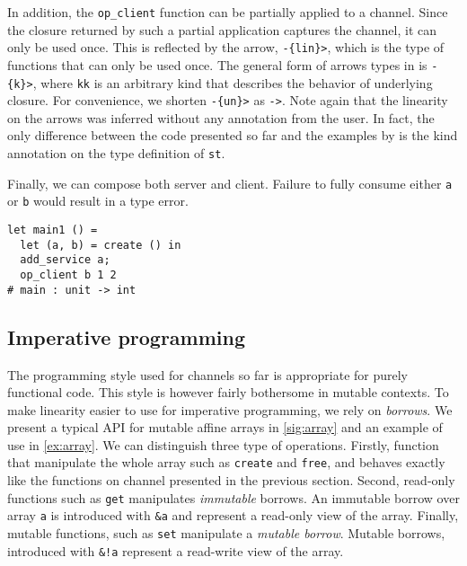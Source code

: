 In addition, the \lstinline/op_client/ function can be partially
applied to a channel. Since the closure returned by such a partial
application captures the channel, it can only be used once.
This is reflected by the arrow, \lstinline/-{lin}>/, which is the
type of functions that can only be used once.
The general form of arrows types in \lang is \lstinline/-{k}>/, where
\lstinline/kk/ is an arbitrary kind that describes the behavior of
underlying closure.
For convenience, we shorten \lstinline/-{un}>/ as \lstinline/->/.
Note again that the linearity on the arrows was inferred without
any annotation from the user. In fact, the only difference between the code
presented so far and the examples by
\citet{DBLP:journals/jfp/Padovani17}
is the kind annotation on the type definition of \lstinline/st/.


Finally, we can compose both server and client.
Failure to fully consume either \lstinline/a/ or \lstinline/b/
would result in a type error.
\begin{lstlisting}
let main1 () =
  let (a, b) = create () in
  add_service a;
  op_client b 1 2
# main : unit -> int
\end{lstlisting}



\subsection{Imperative programming}

The programming style used for channels so far is
appropriate for purely functional code.
This style is however fairly bothersome in mutable contexts.
%
To make linearity easier to use for imperative programming, we rely on
{\em borrows}. We present a typical API for mutable affine arrays
in \cref{sig:array} and an example of use in \cref{ex:array}.
We can distinguish three type of operations. Firstly,
function that manipulate the whole
array such as \lstinline/create/ and \lstinline/free/, and behaves exactly
like the functions on channel presented in the previous section.
Second, read-only functions such as \lstinline/get/
manipulates \emph{immutable} borrows. An immutable borrow over array \lstinline/a/
is introduced with \lstinline/&a/ and represent a read-only view of the array.
Finally, mutable functions, such as \lstinline/set/ manipulate
a \emph{mutable borrow}. Mutable borrows, introduced with \lstinline/&!a/
represent a read-write view of the array.

